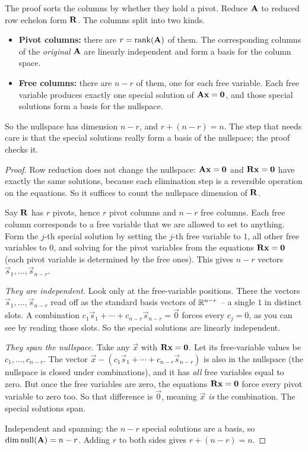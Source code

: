 The proof sorts the columns by whether they hold a pivot. Reduce $\mathbf{A}$ to
reduced row echelon form $\mathbf{R}$. The columns split into two kinds.

\begin{itemize}
  \item \textbf{Pivot columns:} there are $r = \operatorname{rank}(\mathbf{A})$ of them. The
        corresponding columns of the \emph{original} $\mathbf{A}$ are linearly
        independent and form a basis for the column space.
  \item \textbf{Free columns:} there are $n - r$ of them, one for each free
        variable. Each free variable produces exactly one special solution of
        $\mathbf{A}\mathbf{x} = \mathbf{0}$, and those special solutions form a basis for
        the nullspace.
\end{itemize}

So the nullspace has dimension $n - r$, and $r + (n - r) = n$. The step that
needs care is that the special solutions really form a basis of the nullspace;
the proof checks it.

\begin{proof}
Row reduction does not change the nullspace: $\mathbf{A}\mathbf{x}=\mathbf{0}$ and
$\mathbf{R}\mathbf{x}=\mathbf{0}$ have exactly the same solutions, because each elimination
step is a reversible operation on the equations. So it suffices to count the
nullspace dimension of $\mathbf{R}$.

Say $\mathbf{R}$ has $r$ pivots, hence $r$ pivot columns and $n-r$ free columns.
Each free column corresponds to a free variable that we are allowed to set to
anything. Form the $j$-th special solution by setting the $j$-th free variable
to $1$, all other free variables to $0$, and solving for the pivot variables from
the equations $\mathbf{R}\mathbf{x}=\mathbf{0}$ (each pivot variable is determined by the
free ones). This gives $n-r$ vectors $\vec{s}_1,\dots,\vec{s}_{n-r}$.

\emph{They are independent.} Look only at the free-variable positions. There the
vectors $\vec{s}_1,\dots,\vec{s}_{n-r}$ read off as the standard basis vectors of
$\mathbb{R}^{n-r}$ -- a single $1$ in distinct slots. A combination
$c_1\vec{s}_1+\cdots+c_{n-r}\vec{s}_{n-r}=\vec0$ forces every $c_j=0$, as you
can see by reading those slots. So the special solutions are linearly independent.

\emph{They span the nullspace.} Take any $\vec{x}$ with $\mathbf{R}\mathbf{x}=\mathbf{0}$.
Let its free-variable values be $c_1,\dots,c_{n-r}$. The vector
$\vec{x} - (c_1\vec{s}_1+\cdots+c_{n-r}\vec{s}_{n-r})$ is also in the nullspace
(the nullspace is closed under combinations), and it has \emph{all} free
variables equal to zero. But once the free variables are zero, the equations
$\mathbf{R}\mathbf{x} = \mathbf{0}$ force every pivot variable to zero too. So that
difference is $\vec0$, meaning $\vec{x}$ \emph{is} the combination. The special
solutions span.

Independent and spanning: the $n-r$ special solutions are a basis, so
$\operatorname{dim}\operatorname{null}(\mathbf{A}) = n-r$. Adding $r$ to both sides gives $r + (n-r) = n$.
\end{proof}

